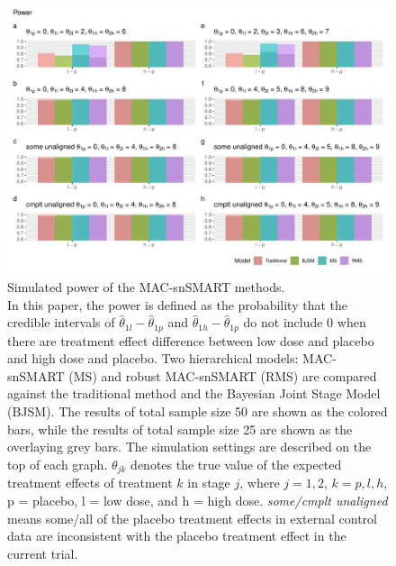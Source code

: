 \begin{figure}[H]
\centerline{\includegraphics[width=\textwidth]{chapters/figures/CRpower.pdf}}
\caption{Simulated power of the MAC-snSMART methods. \\In this paper, the power is defined as the probability that the credible intervals of $\hat{\theta}_{1l} - \hat{\theta}_{1p}$ and $\hat{\theta}_{1h} - \hat{\theta}_{1p}$ do not include 0 when there are treatment effect difference between low dose and placebo and high dose and placebo. Two hierarchical models: MAC-snSMART (MS) and robust MAC-snSMART (RMS) are compared against the traditional method and the Bayesian Joint Stage Model (BJSM). The results of total sample size 50 are shown as the colored bars, while the results of total sample size 25 are shown as the overlaying grey bars. The simulation settings are described on the top of each graph. $\theta_{jk}$ denotes the true value of the expected treatment effects of treatment $k$ in stage $j$, where $j = 1, 2$, $k = p, l, h$, p = placebo, l = low dose, and h = high dose. \emph{some/cmplt unaligned} means some/all of the placebo treatment effects in external control data are inconsistent with the placebo treatment effect in the current trial.}
\label{fig:Power}
\end{figure}


